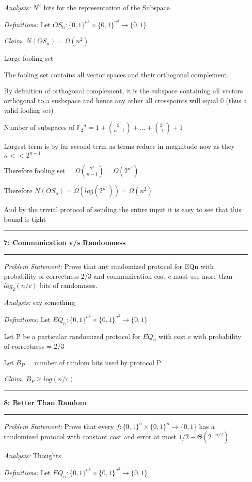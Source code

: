 \documentclass[11pt]{article}
\newcommand\question[2]{\vspace{.25in}\hrule\textbf{#1: #2}\vspace{.5em}\hrule\vspace{.10in}}
\newcommand\analysis{\vspace{.10in}\emph{Analysis: }\newline}
\newcommand\problem{\emph{Problem Statement:}\newline}
\newcommand\definitions{\emph{Definitions:}\newline}
\newcommand\claim{\emph{Claim.}\newline}
\begin{document}
\analysis
$N^2$ bits for the representation of the Subspace

\definitions
Let $OS_n: {\{0, 1\}}^{n^2} \times {\{0, 1\}}^{n^2} \to \{0, 1\}$

\claim
$N(OS_n) = \Omega(n^2)$ 

\proof 
Large fooling set

The fooling set contains all vector spaces and their orthogonal complement. 

By definition of orthogonal complement, it is the subspace containing all vectors orthogonal to a susbspace and hence any other all crosspoints will equal 0 (thus a valid fooling set)

Number of subspaces of ${\mathbb{F}_2}^n = 1 + {2^n \choose n - 1} + ... + {2^n \choose 1} + 1$

Largest term is by far second term as terms reduce in magnitude now as they $n << 2^{n-1}$

Therefore fooling set = $\Omega{2^n \choose n - 1} = \Omega({2^{n^2}})$

Therefore $N(OS_n) = \Omega(log(2^{n^2})) = \Omega(n^2)$

And by the trivial protocol of sending the entire input it is easy to see that this bound is tight
\newpage

\question{7}{Communication v/s Randomness}

\problem
Prove that any randomized protocol for EQn with probability of correctness 2/3 and communication cost c must use more than $log_2(n/c)$ bits of randomness.

\analysis
say something

\definitions
Let $EQ_n: {\{0, 1\}}^{n^2} \times {\{0, 1\}}^{n^2} \to \{0, 1\}$

Let P be a particular randomized protocol for $EQ_n$ with cost c with probability of correctness = 2/3

Let $B_P$ = number of random bits used by protocol P 

\claim
$B_{P} \geq log(n/c)$

\proof 

\newpage
\question{8}{Better Than Random}

\problem
Prove that every $f : {\{0, 1\}}^n \times {\{0, 1\}}^n \to \{0, 1\}$ has a randomized protocol with constant cost and error at most $1/2 - \Theta(2^{-n/2})$

\analysis
Thoughts

\definitions
Let $EQ_n: {\{0, 1\}}^{n^2} \times {\{0, 1\}}^{n^2} \to \{0, 1\}$
\end{document}
